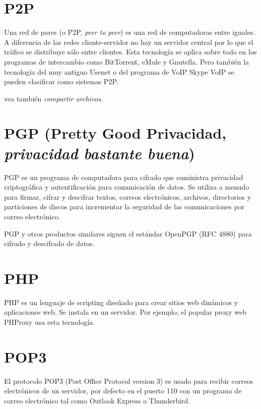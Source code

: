 \documentclass[10pt,a5paper,twoside,,]{book}
\begin{document}
\section{P2P}\label{p2p}

Una red de pares (o P2P, \emph{peer to peer}) es una red de computadoras
entre iguales. A diferencia de las redes cliente-servidor no hay un
servidor central por lo que el tráfico se distribuye sólo entre
clientes. Esta tecnología se aplica sobre todo en los programas de
intercambio como BitTorrent, eMule y Gnutella. Pero también la
tecnología del muy antiguo Usenet o del programa de VoIP Skype VoIP se
pueden clasificar como sistemas P2P.

vea también \emph{compartir archivos}.

\section{\texorpdfstring{PGP (Pretty Good Privacidad, \emph{privacidad
bastante
buena})}{PGP (Pretty Good Privacidad, privacidad bastante buena)}}\label{pgp-pretty-good-privacidad-privacidad-bastante-buena}

PGP es un programa de computadora para cifrado que suministra privacidad
criptográfica y autentificación para comunicación de datos. Se utiliza a
menudo para firmar, cifrar y descifrar textos, correos electrónicos,
archivos, directorios y particiones de discos para incrementar la
seguridad de las comunicaciones por correo electrónico.

PGP y otros productos similares siguen el estándar OpenPGP (RFC 4880)
para cifrado y descifrado de datos.

\section{PHP}\label{php}

PHP es un lenguaje de scripting diseñado para crear sitios web dinámicos
y aplicaciones web. Se instala en un servidor. Por ejemplo, el popular
proxy web PHProxy usa esta tecnología.

\section{POP3}\label{pop3}

El protocolo POP3 (Post Office Protocol version 3) es usado para recibir
correos electrónicos de un servidor, por defecto en el puerto 110 con un
programa de correo electrónico tal como Outlook Express o Thunderbird.
\end{document}
